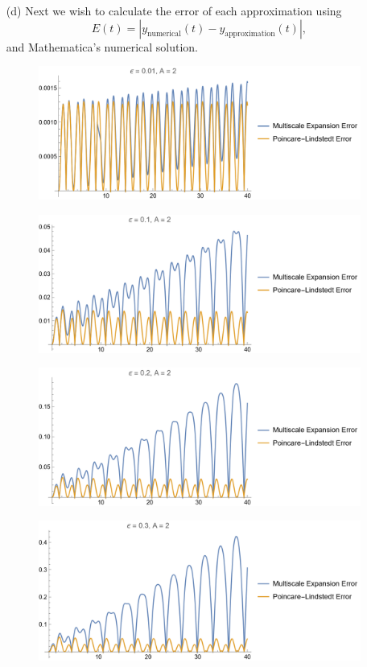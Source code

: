 \documentclass[12pt]{report}
\begin{document}
\begin{solution}
\begin{enumerate}
        \item [(d)]
        Next we wish to calculate the error of each approximation using
        \[ 
            E(t) = |y_{\text{numerical}}(t) - y_{\text{approximation}}(t)|,
        \]
        and Mathematica's numerical solution.
        \begin{figure}[H]
            \center
            \includegraphics[width=.8\textwidth]{plots/2d1.png}
        \end{figure}
        \begin{figure}[H]
            \center
            \includegraphics[width=.8\textwidth]{plots/2d2.png}
        \end{figure}
        \begin{figure}[H]
            \center
            \includegraphics[width=.8\textwidth]{plots/2d3.png}
        \end{figure}
        \begin{figure}[H]
            \center
            \includegraphics[width=.8\textwidth]{plots/2d4.png}
        \end{figure}
        
    \end{enumerate}
\end{solution}

\newpage
\end{document}
